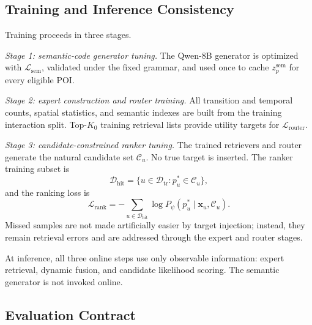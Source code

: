 \documentclass[journal]{IEEEtran}
\newcommand{\Train}{\mathcal{D}_{\mathrm{tr}}}
\newcommand{\HitTrain}{\mathcal{D}_{\mathrm{hit}}}
\begin{document}
\subsection{Training and Inference Consistency}
\label{subsec:training}

Training proceeds in three stages.

\textit{Stage 1: semantic-code generator tuning.}
The Qwen-8B generator is optimized with
$\mathcal{L}_{\mathrm{sem}}$, validated under the fixed grammar, and used once
to cache $z_p^{\mathrm{sem}}$ for every eligible POI.

\textit{Stage 2: expert construction and router training.}
All transition and temporal counts, spatial statistics, and semantic indexes
are built from the training interaction split.
Top-$K_0$ training retrieval lists provide utility targets for
$\mathcal{L}_{\mathrm{router}}$.

\textit{Stage 3: candidate-constrained ranker tuning.}
The trained retrievers and router generate the natural candidate set
$\mathcal{C}_u$.
No true target is inserted.
The ranker training subset is
\begin{equation}
\HitTrain
=
\{u\in\Train:p_u^{*}\in\mathcal{C}_u\},
\label{eq:hit_training_set}
\end{equation}
and the ranking loss is
\begin{equation}
\mathcal{L}_{\mathrm{rank}}
=
-
\sum_{u\in\HitTrain}
\log
P_{\psi}(p_u^{*}\mid\bm{x}_u,\mathcal{C}_u).
\label{eq:rank_loss}
\end{equation}
Missed samples are not made artificially easier by target injection; instead,
they remain retrieval errors and are addressed through the expert and router
stages.

At inference, all three online steps use only observable information:
expert retrieval, dynamic fusion, and candidate likelihood scoring.
The semantic generator is not invoked online.

\subsection{Evaluation Contract}
\label{subsec:evaluation_contract}
\end{document}
